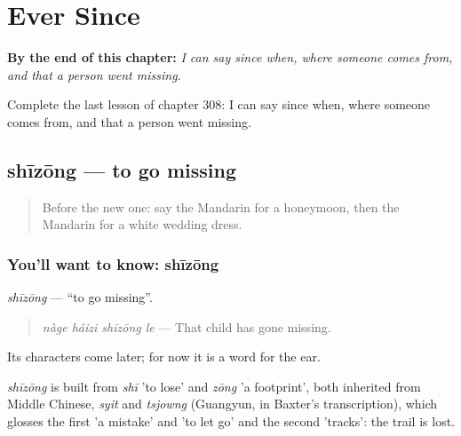 
\chapter{Ever Since}
\label{ch:zh-ever-since}

\begin{chapteropening}
\textbf{By the end of this chapter:} \emph{I can say since when, where someone comes from, and that a person went missing.}

Complete the last lesson of chapter 308: I can say since when, where someone comes from, and that a person went missing.
\end{chapteropening}

\section[shīzōng]{shīzōng — to go missing}

\label{lesson:ZH-C308-shizong}



\begin{quote}
Before the new one: say the Mandarin for a honeymoon, then the Mandarin for a white wedding dress.
\end{quote}

\subsection*{You'll want to know: shīzōng}
\emph{shīzōng} — \textquotedblleft{}to go missing\textquotedblright{}.

\begin{quote}
\emph{nàge háizi shīzōng le} — That child has gone missing.
\end{quote}

Its characters come later; for now it is a word for the ear.

\begin{cousinweb}
\emph{shīzōng} is built from \emph{shī} 'to lose' and \emph{zōng} 'a footprint', both inherited from Middle Chinese, \emph{syit} and \emph{tsjowng} (Guangyun, in Baxter's transcription), which glosses the first 'a mistake' and 'to let go' and the second 'tracks': the trail is lost.
\end{cousinweb}

